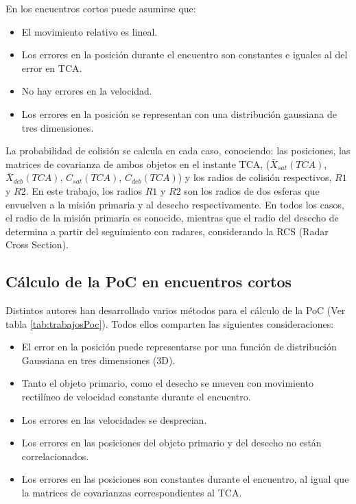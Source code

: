 En los encuentros cortos puede asumirse que:\\

\begin{itemize}
\itemsep0em
 \item El movimiento relativo es lineal.
 \item Los errores en la posici\'on durante el encuentro son constantes e iguales al del error en TCA.
 \item No hay errores en la velocidad.
 \item Los errores en la posici\'on se representan con una distribuci\'on gaussiana de tres dimensiones.
\end{itemize}

La probabilidad de colisi\'on se calcula en cada caso, conociendo: las posiciones, las matrices de covarianza de ambos objetos en el instante TCA, ($\bar{X}_{sat}(TCA)$, $\bar{X}_{deb}(TCA)$, $C_{sat}(TCA)$, $C_{deb}(TCA)$) y los radios de colisi\'on respectivos, $R1$ y $R2$. En este trabajo, los radios $R1$ y $R2$  son los radios de dos esferas que envuelven a la misi\'on primaria y al desecho respectivamente. En todos los casos, el radio de la misi\'on primaria es conocido, mientras que el radio del desecho de determina a partir del seguimiento con radares, considerando la RCS (Radar Cross Section). 

\subsection*{C\'alculo de la PoC en encuentros cortos}

Distintos autores han desarrollado varios m\'etodos para el c\'alculo de la PoC (Ver tabla \ref{tab:trabajosPoc}). Todos ellos comparten las siguientes consideraciones:\\
\begin{itemize}
\itemsep0em
\item El error en la posici\'on puede representarse por una funci\'on de distribuci\'on Gaussiana en tres dimensiones (3D).
\item Tanto el objeto primario, como el desecho se mueven con movimiento rectil\'ineo de velocidad constante durante el encuentro.
\item Los errores en las velocidades se desprecian.
\item Los errores en las posiciones del objeto primario y del desecho no est\'an correlacionados.
\item Los errores en las posiciones son constantes durante el encuentro, al igual que la matrices de covarianzas correspondientes al TCA.
\end{itemize}

